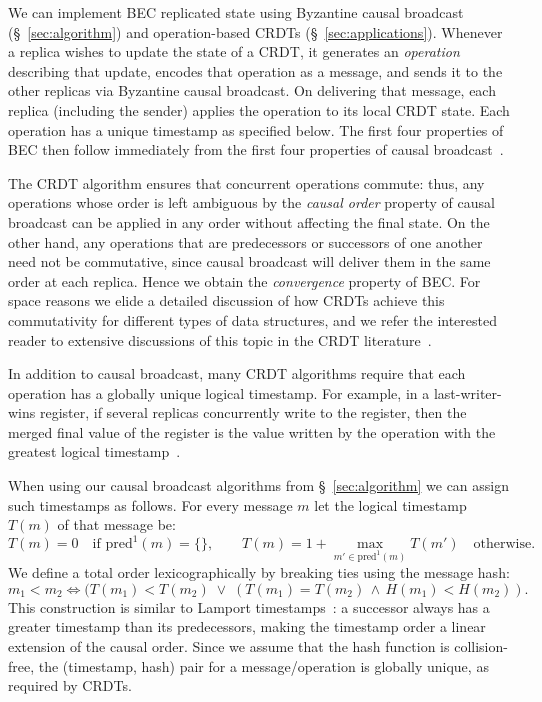 \documentclass[a4paper,anonymous,USenglish]{lipics-v2019}
\begin{document}
We can implement BEC replicated state using Byzantine causal broadcast (\S~\ref{sec:algorithm}) and operation-based CRDTs (\S~\ref{sec:applications}).
Whenever a replica wishes to update the state of a CRDT, it generates an \emph{operation} describing that update, encodes that operation as a message, and sends it to the other replicas via Byzantine causal broadcast.
On delivering that message, each replica (including the sender) applies the operation to its local CRDT state.
Each operation has a unique timestamp as specified below.
The first four properties of BEC then follow immediately from the first four properties of causal broadcast~\cite{Gomes:2017gy}.

The CRDT algorithm ensures that concurrent operations commute: thus, any operations whose order is left ambiguous by the \emph{causal order} property of causal broadcast can be applied in any order without affecting the final state.
On the other hand, any operations that are predecessors or successors of one another need not be commutative, since causal broadcast will deliver them in the same order at each replica.
Hence we obtain the \emph{convergence} property of BEC.
For space reasons we elide a detailed discussion of how CRDTs achieve this commutativity for different types of data structures, and we refer the interested reader to extensive discussions of this topic in the CRDT literature~\cite{Gomes:2017gy,Shapiro:2011wy,Weiss:2009ht}.

In addition to causal broadcast, many CRDT algorithms require that each operation has a globally unique logical timestamp.
For example, in a last-writer-wins register, if several replicas concurrently write to the register, then the merged final value of the register is the value written by the operation with the greatest logical timestamp~\cite{Shapiro:2011wy}.

When using our causal broadcast algorithms from \S~\ref{sec:algorithm} we can assign such timestamps as follows.
For every message $m$ let the logical timestamp $T(m)$ of that message be:
\[ T(m) = 0 \quad\text{if } \mathrm{pred}^1(m) = \{\}, \qquad
T(m) = 1 + \max_{m' \in \mathrm{pred}^1(m)} T(m') \quad\text{otherwise.} \]
We define a total order lexicographically by breaking ties using the message hash:
\[ m_1 < m_2 \iff (T(m_1) < T(m_2) \;\vee\; (T(m_1) = T(m_2) \,\wedge\, H(m_1) < H(m_2)). \]
This construction is similar to Lamport timestamps~\cite{Lamport:1978}: a successor always has a greater timestamp than its predecessors, making the timestamp order a linear extension of the causal order.
Since we assume that the hash function is collision-free, the (timestamp, hash) pair for a message/operation is globally unique, as required by CRDTs.
\end{document}
